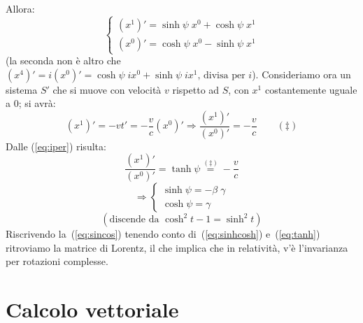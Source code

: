 \begin{osservazione}
Allora:
\begin{equation}
\left\{\begin{array}{l}
(x^1)'=\sinh\psi\;x^0 + \cosh\psi\;x^1\\
(x^0)'=\cosh\psi\;x^0 - \sinh\psi\;x^1
\end{array}\right.
\label{eq:iper}
\end{equation}
(la seconda non \`e altro che
$(x^4)'=i(x^0)'=\cosh\psi\;ix^0+\sinh\psi\;ix^1 \mbox{, divisa per } i$).  
Consideriamo ora un sistema $S'$ che si muove con velocit\`a $v$
rispetto ad $S$, con $x^1$ costantemente uguale a 0; si avr\`a: 
\begin{equation}
 (x^1)'=-vt'=-\frac{v}{c}(x^0)'\Rightarrow\frac{(x^1)'}{(x^0)'}=-\frac{v}{c}
\qquad(\ddagger) 
\end{equation}
Dalle (\ref{eq:iper}) risulta: 
\begin{equation}
 \frac{(x^1)'}{(x^0)'}=\tanh\psi\stackrel{(\ddagger)}{=}-\frac{v}{c}
\end{equation}
\begin{equation}
\Longrightarrow\left\{\begin{array}{l}
\sinh\psi=-\beta\;\gamma\\
\cosh\psi=\gamma
\end{array}\right.
\label{eq:tanh}
\end{equation}
\begin{equation}
 (\mbox{discende da } \cosh^2t-1=\sinh^2t)
\end{equation}
Riscrivendo la~(\ref{eq:sincos}) tenendo conto di~(\ref{eq:sinhcosh}) 
e~(\ref{eq:tanh}) ritroviamo la matrice di Lorentz, il che implica
che in relativit\`a, v'\`e l'invarianza per rotazioni complesse.
\end{osservazione}
\section{Calcolo vettoriale}
